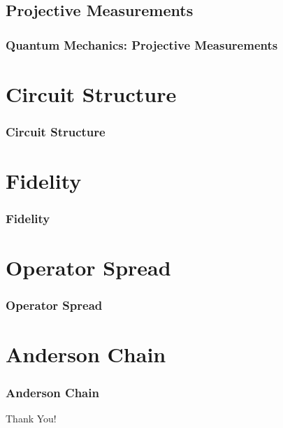 \documentclass[11pt, xcolor={dvipsnames, svgnames, table, x11names}, color]{beamer}
\begin{document}
\subsection{Projective Measurements}
\begin{frame}
    \frametitle{Quantum Mechanics: Projective Measurements}
\end{frame}


\section{Circuit Structure}
\begin{frame}
    \frametitle{Circuit Structure}
\end{frame}


\section{Fidelity}
\begin{frame}
    \frametitle{Fidelity}
\end{frame}


\section{Operator Spread}
\begin{frame}
    \frametitle{Operator Spread}
\end{frame}


\section{Anderson Chain}
\begin{frame}
    \frametitle{Anderson Chain}
\end{frame}


\begin{frame}
    \begin{center}
        \Huge{Thank You!}
    \end{center}
\end{frame}
\end{document}
